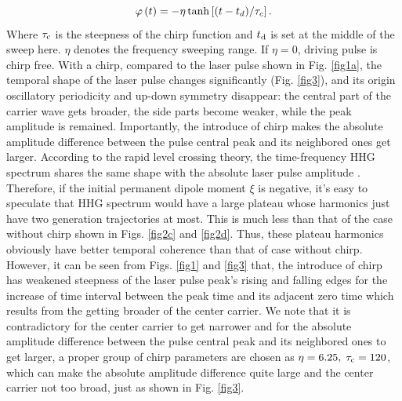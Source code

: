 \documentclass[10pt,letterpaper]{article}
\begin{document}
\begin{equation}
\varphi \left( t \right) =  - \eta \tanh \left[ {{{\left( {t - {t_d}} \right)} \mathord{\left/
			{\vphantom {{\left( {t - {t_d}} \right)} {{\tau _c}}}} \right.
			\kern-\nulldelimiterspace} {{\tau _c}}}} \right].
\label{eq17}
\end{equation}
Where $ \tau_{\rm{c}} $ is the steepness of the chirp function and $ t_{\rm{d}} $ is set at the middle of the sweep here. $ \eta $  denotes the frequency sweeping range. If $ \eta=0 $, driving pulse is chirp free. With a chirp, compared to the laser pulse shown in Fig. \ref{fig1a}, the temporal shape of the laser pulse changes significantly (Fig. \ref{fig3}), and its origin oscillatory periodicity and up-down symmetry disappear: the central part of the carrier wave gets broader, the side parts become weaker, while the peak amplitude is remained. Importantly, the introduce of chirp makes the absolute amplitude difference between the pulse central peak and its neighbored ones get larger. According to the rapid level crossing theory, the time-frequency HHG spectrum shares the same shape with the absolute laser pulse amplitude \cite{CuiNi2010NJP-wavelet}. Therefore, if the initial permanent dipole moment $\xi$ is negative, it's easy to speculate that HHG spectrum would have a large plateau whose harmonics just have two generation trajectories at most. This is much less than that of the case without chirp shown in Figs. \ref{fig2c} and \ref{fig2d}. Thus, these plateau harmonics obviously have better temporal coherence than that of case without chirp. However, it can be seen from Figs. \ref{fig1} and \ref{fig3} that, the introduce of chirp has weakened steepness of the laser pulse peak's rising and falling edges for the increase of time interval between the peak time and its adjacent zero time which results from the getting broader of the center carrier. We note that it is contradictory for the center carrier to get narrower and for the absolute amplitude difference between the pulse central peak and its neighbored ones to get larger, a proper group of chirp parameters are chosen as $\eta=6.25,\;\tau_{\rm{c}}=120$, which can make the absolute amplitude difference quite large and the center carrier not too broad, just as shown in Fig. \ref{fig3}.
\end{document}
